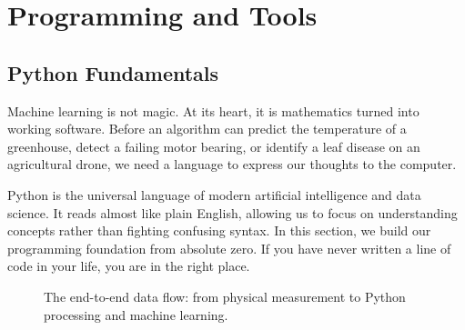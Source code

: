 \chapter{Programming and Tools}\label{ch:programming_tools}
\section{Python Fundamentals}\label{sec:python_fundamentals}

Machine learning is not magic. At its heart, it is mathematics turned into working software. Before an algorithm can predict the temperature of a greenhouse, detect a failing motor bearing, or identify a leaf disease on an agricultural drone, we need a language to express our thoughts to the computer. 

Python is the universal language of modern artificial intelligence and data science. It reads almost like plain English, allowing us to focus on understanding concepts rather than fighting confusing syntax. In this section, we build our programming foundation from absolute zero. If you have never written a line of code in your life, you are in the right place.

\begin{figure}[htbp]
\centering
{}
\caption{The end-to-end data flow: from physical measurement to Python processing and machine learning.}\label{fig:iot_pipeline}
\end{figure}

